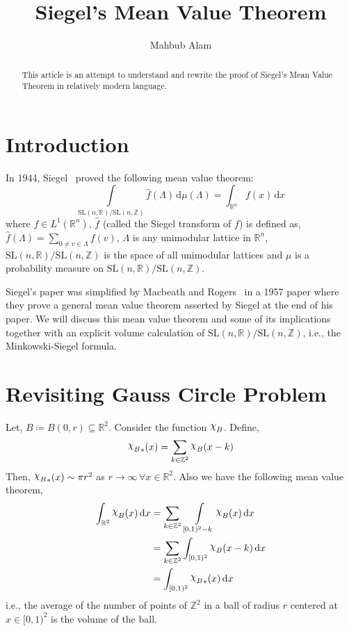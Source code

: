\documentclass[11pt]{article}
\theoremstyle{definition}
\newcommand{\mychi}{\raisebox{2pt}{$\chi$}}
\begin{document}
\title{\bfseries Siegel's Mean Value Theorem}

\author{Mahbub Alam}

\date{}

\maketitle

\begin{abstract}
    This article is an attempt to understand and rewrite the proof of Siegel's Mean Value Theorem in relatively modern language.
\end{abstract}

\section{Introduction}
In 1944, Siegel~\cite{siegel45} proved the following mean value theorem:
\[
    \int\limits_{\mathrm{SL}(n,\mathbb{R}) / \mathrm{SL}(n,\mathbb{Z})} \widehat{f}(\Lambda ) \, \mathrm{d} \mu (\Lambda ) = \int_{\mathbb{R}^n}f(x) \, \mathrm{d} x
\]
where $f\in L^1(\mathbb{R}^n )$, $\widehat{f}$ (called the Siegel transform of $f$) is defined as, $\widehat{f}( \Lambda ) = \displaystyle\sum_{0 \neq v \in \Lambda } f(v)$, $\Lambda$ is any unimodular lattice in $\mathbb{R}^{n}$, $\mathrm{SL}(n, \mathbb{R})/ \mathrm{SL}(n, \mathbb{Z})$ is the space of all unimodular lattices and $\mu$ is a probability measure on $\mathrm{SL}(n,\mathbb{R})/\mathrm{SL}(n,\mathbb{Z})$.

Siegel's paper was simplified by Macbeath and Rogers~\cite{macbeathrogers58} in a 1957 paper where they prove a general mean value theorem asserted by Siegel at the end of his paper.
We will discuss this mean value theorem and some of its implications together with an explicit volume calculation of $\mathrm{SL}(n,\mathbb{R})/\mathrm{SL}(n,\mathbb{Z})$, i.e., the Minkowski-Siegel formula.

\section{Revisiting Gauss Circle Problem}
Let, $B \coloneqq B(0, r) \subseteq \mathbb{R}^2$.
Consider the function $\mychi _B$.
Define,
\[
    {\mychi _B}_*(x) = \sum_{k \in \mathbb{Z}^2} \mychi _B(x-k)
\]
Then, ${\mychi _B}_*(x) \sim \pi r^2$ as $r \to \infty\, \forall x \in \mathbb{R}^2$.
Also we have the following mean value theorem,
\begin{align*}
    \int_{\mathbb{R}^2} \mychi _B (x)\, \mathrm{d} x &= \displaystyle\sum_{k \in \mathbb{Z}^2} \, \int\limits_{[0,1)^2 - k} \mychi _B (x) \, \mathrm{d} x\\
    &= \displaystyle\sum_{k \in \mathbb{Z}^2} \int_{[0,1)^2} \mychi _B (x-k) \, \mathrm{d} x\\
    &= \int_{[0,1)^2} {\mychi _B}_*(x) \, \mathrm{d} x
\end{align*}
i.e., the average of the number of points of $\mathbb{Z}^2$ in a ball of radius $r$ centered at $x \in [0,1)^2$ is the volume of the ball.
\end{document}
